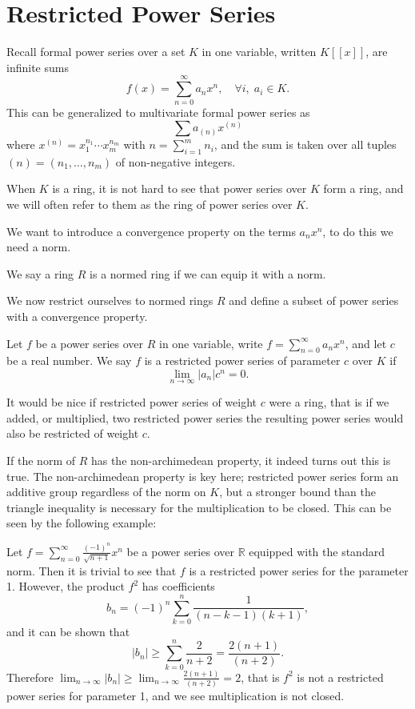 \chapter{Restricted Power Series}

Recall formal power series over a set $K$ in one variable, written $K [ \! [ x ] \! ] $, are
infinite sums
\[
f(x) = \sum_{n=0}^\infty a_n x^n, \quad \forall i, \; a_i \in K.
\]
This can be generalized to multivariate formal power series as
\[
\sum a_{(n)} x^{(n)}
\]
where $x^{(n)} = x_1^{n_1} \cdots x_m^{n_m}$ with $n = \sum_{i = 1}^m n_i$, and the sum is taken
over all tuples $(n) = (n_1,\dots,n_m)$ of non-negative integers.

When $K$ is a ring, it is not hard to see that power series over $K$ form a ring, and we will often
refer to them as the ring of power series over $K$.

We want to introduce a convergence property on the terms $a_n x^n$, to do this we need a norm.

\begin{definition}
    We say a ring $R$ is a normed ring if we can equip it with a norm.
\end{definition}

We now restrict ourselves to normed rings $R$ and define a subset of power series with a convergence
property.

\begin{definition}
    Let $f$ be a power series over $R$ in one variable, write $f = \sum_{n=0}^\infty a_n x^n$, and
    let $c$ be a real number. We say $f$ is a restricted power series of parameter $c$ over $K$ if
    \[
    \lim_{n \to \infty} \lvert a_n \rvert c^n = 0.
    \]
\end{definition}

It would be nice if restricted power series of weight $c$ were a ring, that is if we added, or
multiplied, two restricted power series the resulting power series would also be restricted of
weight $c$.

If the norm of $R$ has the non-archimedean property, it indeed turns out this is true.
The non-archimedean property is key here; restricted power series form an additive group regardless
of the norm on $K$, but a stronger bound than the triangle inequality is necessary for the
multiplication to be closed. This can be seen by the following example:

\begin{example}

Let $f = \sum_{n=0}^\infty \frac{(-1)^n}{\sqrt{n+1}}x^n$ be a power series over $\mathbb{R}$
equipped with the standard norm. Then it is trivial to see that $f$ is a restricted power series for
the parameter 1. However, the product $f^2$ has coefficients
\[
b_n = (-1)^n \sum_{k=0}^n \frac{1}{(n - k -1)(k+1)},
\]
and it can be shown that
\[
\lvert b_n\rvert \geq \sum_{k = 0}^n \frac{2}{n + 2} = \frac{2 (n + 1)}{(n + 2)}.
\]
Therefore $\lim_{n \to \infty} \lvert b_n \rvert \geq \lim_{n \to \infty} \frac{2(n+1)}{(n+2)}=2$,
that is $f^2$ is not a restricted power series for parameter 1, and we see multiplication is not
closed.

\end{example}

